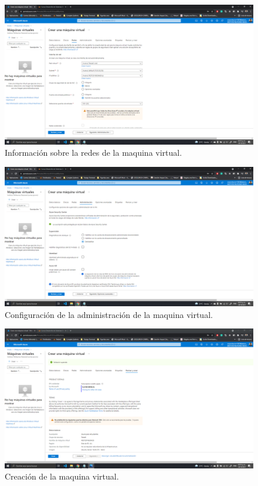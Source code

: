 \documentclass[11pt]{article}
\begin{document}
		\begin{figure}[H]
			\centering
			\includegraphics[scale=0.34]{resources/redes.png}
			\caption{Información sobre la redes de la maquina virtual.}\label{fig:picture}
		\end{figure}
		\begin{figure}[H]
			\centering
			\includegraphics[scale=0.34]{resources/admin.png}
			\caption{Configuración de la administración de la maquina virtual.}\label{fig:picture}
		\end{figure}
		\begin{figure}[H]
			\centering
			\includegraphics[scale=0.34]{resources/revisarycrear.png}
			\caption{Creación de la maquina virtual.}\label{fig:picture}
		\end{figure}
\end{document}
